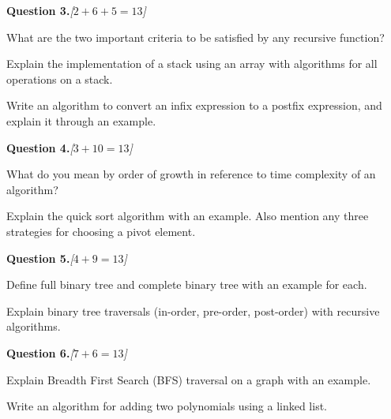 \documentclass[11pt,a4paper]{article}
\newcommand{\pts}[1]{\hfill   \textit{[#1]}}
\begin{document}
\bigskip




\noindent   \textbf{Question 3.}\pts{$2+6+5=13$}

\begin{parts}
  \item What are the two important criteria to be satisfied by any recursive function?
  \item Explain the implementation of a stack using an array with algorithms for all operations on a stack.
  \item Write an algorithm to convert an infix expression to a postfix expression, and explain it through an example.
\end{parts}

\bigskip




\noindent   \textbf{Question 4.}\pts{$3+10=13$}

\begin{parts}
  \item What do you mean by order of growth in reference to time complexity of an algorithm?
  \item Explain the quick sort algorithm with an example. Also mention any three strategies for choosing a pivot element.
\end{parts}

\bigskip




\noindent   \textbf{Question 5.}\pts{$4+9=13$}

\begin{parts}
  \item Define full binary tree and complete binary tree with an example for each.
  \item Explain binary tree traversals (in-order, pre-order, post-order) with recursive algorithms.
\end{parts}

\bigskip




\noindent   \textbf{Question 6.}\pts{$7+6=13$}

\begin{parts}
  \item Explain Breadth First Search (BFS) traversal on a graph with an example.
  \item Write an algorithm for adding two polynomials using a linked list.
\end{parts}

\bigskip
\end{document}
